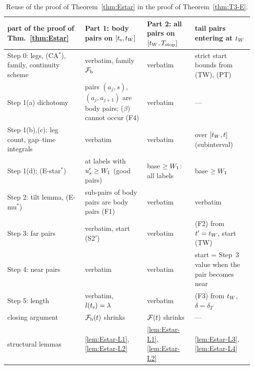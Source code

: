 \begin{table}[ht]
\centering\small
\begin{tabular}{@{}p{}p{}p{}p{}@{}}
\toprule
part of the proof of Thm.~\ref{thm:Estar} & Part 1: body pairs on $[t_{\mathrm s},t_W]$ & Part 2: all pairs on $[t_W,T_{\mathrm{stop}}]$ & tail pairs entering at $t_W$\\
\midrule
Step 0: legs, (CA$^*$), family, continuity scheme & verbatim, family $\mathcal F_{\mathrm b}$ & verbatim & strict start bounds from (TW), (PT)\\
Step 1(a) dichotomy & pairs $(a_j,s)$, $(a_j,a_{j+1})$ are body pairs; ($\beta$) cannot occur (F4) & verbatim & ---\\
Step 1(b),(c): leg count, gap--time integrals & verbatim & verbatim & over $[t_W,t]$ (subinterval)\\
Step 1(d): (E-star$^*$) & at labels with $u_s'\ge W_1$ (good pairs) & base $\ge W_1$: all labels & base $\ge W_1$\\
Step 2: tilt lemma, (E-mu$^*$) & sub-pairs of body pairs are body pairs (F1) & verbatim & verbatim\\
Step 3: far pairs & verbatim, start (S2$'$) & verbatim & (F2) from $t'=t_W$, start (TW)\\
Step 4: near pairs & verbatim & verbatim & start = Step~3 value when the pair becomes near\\
Step 5: length & verbatim, $l(t_{\mathrm s})=\lambda$ & verbatim & (F3) from $t_W$, $\delta=\delta_T$\\
closing argument & $\mathcal F_{\mathrm b}(t)$ shrinks & $\mathcal F(t)$ shrinks & ---\\
\midrule
structural lemmas & \ref{lem:Estar-L1}, \ref{lem:Estar-L2} & \ref{lem:Estar-L1}, \ref{lem:Estar-L2} & \ref{lem:Estar-L3}, \ref{lem:Estar-L4}\\
\bottomrule
\end{tabular}
\caption{Reuse of the proof of Theorem~\ref{thm:Estar} in the proof of Theorem~\ref{thm:T3-E}.}\label{tab:T3-reuse}
\end{table}

